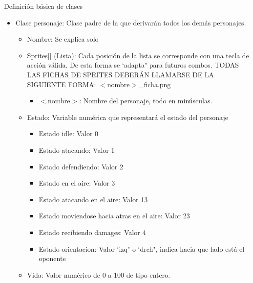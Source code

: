 \documentclass[10pt,a4paper,titlepage]{article}
\begin{document}
Definición básica de clases
\begin{itemize}
	\item Clase personaje: Clase padre de la que derivarán todos los demás personajes.
	\begin{itemize}
		\item Nombre: Se explica solo 
		\item Sprites[] (Lista): Cada posición de la lista se corresponde con una tecla de acción válida. De esta forma se `adapta" para futuros combos.
				TODAS LAS FICHAS DE SPRITES DEBERÁN LLAMARSE DE LA SIGUIENTE FORMA: $<$nombre$>$\_ficha.png
		\begin{itemize}
			\item $<$nombre$>$: Nombre del personaje, todo en minúsculas.
		\end{itemize}
		\item Estado: Variable numérica que representará el estado del personaje
		\begin{itemize}
			\item Estado idle: Valor 0
			\item Estado atacando: Valor 1
			\item Estado defendiendo: Valor 2
			\item Estado en el aire: Valor 3
			\item Estado atacando en el aire: Valor 13
			\item Estado moviendose hacia atras en el aire: Valor 23
			\item Estado recibiendo damages: Valor 4
			\item Estado orientacion: Valor `izq" o `drch", indica hacia que lado está el oponente
		\end{itemize}
		\item Vida: Valor numérico de 0 a 100 de tipo entero.
	\end{itemize}
\end{itemize}
\end{document}
